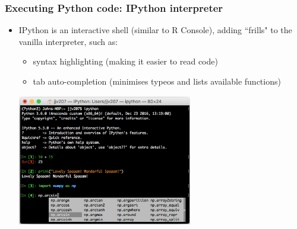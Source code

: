 \documentclass[pdf]{beamer}
\begin{document}
\begin{frame}[fragile]
\frametitle{Executing Python code: IPython interpreter}
\begin{itemize}
	\item IPython is an interactive shell (similar to R Console), adding ``frills" to the vanilla interpreter, such as:

	\begin{itemize}
		\item syntax highlighting (making it easier to read code)
		\item tab auto-completion (minimises typeos and lists available functions)  
	\end{itemize}

	\centering
	\includegraphics[width=0.6\textwidth]{ipython.png}

\end{itemize}
\end{frame}
\end{document}
